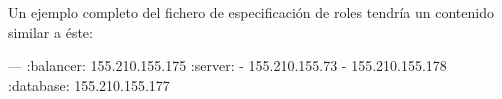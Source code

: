 Un ejemplo completo del fichero de especificación de roles tendría un contenido similar a éste:
\begin{yamlcode}
--- 
:balancer: 155.210.155.175
:server:
- 155.210.155.73
- 155.210.155.178
:database: 155.210.155.177
\end{yamlcode}



%   
%   
%   
%   
